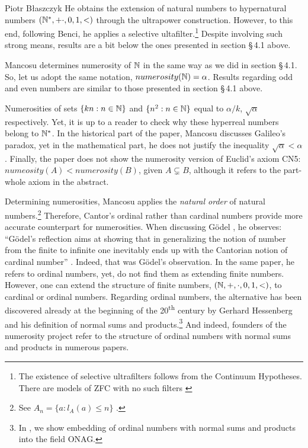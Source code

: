 \begin{artengenv}{Piotr Błaszczyk}
He obtains the extension of natural numbers to hypernatural numbers \mbox{$({\mathbb{N}}^*,+\cdot,0,1,<)$} through the ultrapower construction. However, to this end,  following Benci, he applies a selective ultafilter.\footnote{The existence of selective ultrafilters follows from the Continuum Hypotheses. There are models of ZFC with no such filters \parencite[see][76]{ref_tj}} 
Despite involving such strong means, results are a bit below the ones presented in section \S\,4.1 above. 


Mancosu determines numerosity of ${\mathbb{N}}$ in the same way as we did in section \S\,4.1. So, let us adopt the same notation, $numerosity({\mathbb{N}})=\alpha$. Results regarding odd and even numbers are similar to those presented in section \S\,4.1 above. 
 
 Numerosities of sets $\{kn:n\in{\mathbb{N}}\}$ and $\{n^2:n\in{\mathbb{N}}\}$ equal  to  $\alpha/k$, $\sqrt{\alpha}$ respectively. Yet,  it is up to a reader to check why these hyperreal numbers belong to ${\mathbb{N}}^*$.  In the historical part of the paper, Mancosu discusses Galileo's paradox, yet in the mathematical part, he does not justify the inequality $\sqrt{\alpha}<\alpha$.
 Finally, the paper does not show the numerosity version of Euclid's axiom CN5: $numeosity (A)<numerosity(B)$, given $A\subsetneq B$, although it refers to the part-whole axiom
 in the abstract. 
 
 Determining numerosities, Mancosu  applies the \textit{natural order} of natural 
 numbers.\footnote{See $A_n=\{a : l_A(a)\leq n\}$ \parencite[632]{ref_pm09}.}
 Therefore, Cantor's ordinal rather than cardinal numbers provide  more accurate counterpart for numerosities. 
When discussing G\"{o}del \parencite*{ref_kg47}, he observes: ``G\"{o}del's reflection aims at showing that in generalizing the notion of number from the finite to infinite one inevitably ends up with the Cantorian notion of cardinal number'' \parencite[638]{ref_pm09}. Indeed, that was G\"{o}del's observation. In the same paper, he refers to ordinal numbers, yet, do not find them as extending finite numbers.  However, one can extend the structure of finite numbers, $({\mathbb{N}},+,\cdot, 0,1,<)$,  to cardinal or ordinal numbers. Regarding ordinal numbers, the alternative has been discovered already at the beginning of the 20\textsuperscript{th} century by Gerhard Hessenberg \parencite*{ref_gh06} and his definition of normal sums and products.\footnote{In \parencite[\S\,8]{ref_bf},  we show embedding of ordinal numbers with normal sums and products into the field ONAG.} And indeed, founders of the numerosity project refer to the structure of ordinal numbers with normal sums and products in numerous papers.
 


\end{artengenv}
